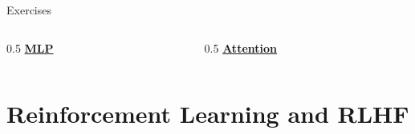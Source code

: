 \documentclass[aspectratio=169]{beamer}
\begin{document}
\begin{frame}{Exercises}
\begin{columns}[c]
\begin{column}{0.5\textwidth}
\centering
\Large \href{https://colab.research.google.com/github/iliad-team/iliad-intensive-C.1.1/blob/main/lectures/01_a_ml_foundations/exercises/04_mlp/notebook.ipynb}{\textbf{MLP}} \\[1em]
\end{column}
\begin{column}{0.5\textwidth}
\centering
\Large \href{https://colab.research.google.com/github/iliad-team/iliad-intensive-C.1.1/blob/main/lectures/01_a_ml_foundations/exercises/05_attention/notebook.ipynb}{\textbf{Attention}} \\[1em]
\end{column}
\end{columns}
\end{frame}

\section{Reinforcement Learning and RLHF}
\end{document}
